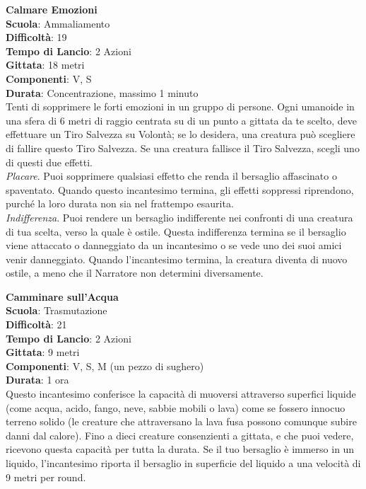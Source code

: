 \begin{multicols}{2}
\medskip\textbf{Calmare Emozioni}\\
\textbf{Scuola}: Ammaliamento\\
\textbf{Difficoltà}: 19\\
\textbf{Tempo di Lancio}: 2 Azioni\\
\textbf{Gittata}: 18 metri\\
\textbf{Componenti}: V, S\\
\textbf{Durata}: Concentrazione, massimo 1 minuto\\
Tenti di sopprimere le forti emozioni in un gruppo di persone. Ogni umanoide in una sfera di 6 metri di raggio centrata su di un punto a gittata da te scelto, deve effettuare un Tiro Salvezza su Volontà; se lo desidera, una creatura può scegliere di fallire questo Tiro Salvezza. Se una creatura fallisce il Tiro Salvezza, scegli uno di questi due effetti. \\
\textit{Placare}. Puoi sopprimere qualsiasi effetto che renda il bersaglio affascinato o spaventato. Quando questo incantesimo termina, gli effetti soppressi riprendono, purché la loro durata non sia nel frattempo esaurita.\\
\textit{Indifferenza}. Puoi rendere un bersaglio indifferente nei confronti di una creatura di tua scelta, verso la quale è ostile. Questa indifferenza termina se il bersaglio viene attaccato o danneggiato da un incantesimo o se vede uno dei suoi amici venir danneggiato. Quando l'incantesimo termina, la creatura diventa di nuovo ostile, a meno che il Narratore non determini diversamente.

\medskip\textbf{Camminare sull'Acqua}\\
\textbf{Scuola}: Trasmutazione\\
\textbf{Difficoltà}: 21\\
\textbf{Tempo di Lancio}: 2 Azioni\\
\textbf{Gittata}: 9 metri\\
\textbf{Componenti}: V, S, M (un pezzo di sughero)\\
\textbf{Durata}: 1 ora\\
Questo incantesimo conferisce la capacità di muoversi attraverso superfici liquide (come acqua, acido, fango, neve, sabbie mobili o lava) come se fossero innocuo terreno solido (le creature che attraversano la lava fusa possono comunque subire danni dal calore). Fino a dieci creature consenzienti a gittata, e che puoi vedere, ricevono questa capacità per tutta la durata. Se il tuo bersaglio è immerso in un liquido, l'incantesimo riporta il bersaglio in superficie del liquido a una velocità di 9 metri per round. 


\end{multicols}
